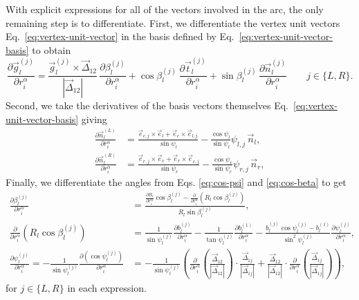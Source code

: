 With explicit expressions for all of the vectors involved in the arc, the only remaining step is to differentiate.
First, we differentiate the vertex unit vectors Eq.\ \eqref{eq:vertex-unit-vector} in the basis defined by Eq.\ \eqref{eq:vertex-unit-vector-basis} to obtain
\begin{equation}
  \frac{\partial \vec{g}_l^{(j)}}{\partial r_i^\alpha} =
  \frac{\vec{g}_l^{(j)} \times \vec{\Delta}_{12}}{|\vec{\Delta}_{12}|} \,
  \frac{\partial \beta_l^{(j)}}{\partial r_i^\alpha} +
  \cos{\beta_l^{(j)}} \,
  \frac{\partial \vec{t}_l^{(j)}}{\partial r_i^\alpha} +
  \sin{\beta_l^{(j)}} \,
  \frac{\partial \vec{n}_l^{(j)}}{\partial r_i^\alpha}
  \qquad j \in \{L,R\}.
\end{equation}
Second, we take the derivatives of the basis vectors themselves Eq.\ \eqref{eq:vertex-unit-vector-basis} giving
\begin{subequations}
\begin{align}
  \frac{\partial \vec{n}_l^{(L)}}{\partial r_i^\alpha} &=
  \frac{\vec{e}_{c,j} \times \vec{e}_l + \vec{e}_c \times \vec{e}_{l,j}}{\sin{\psi_l}}
  - \frac{\cos{\psi_l}}{\sin{\psi_l}} \psi_{l,j} \, \vec{n}_l, \\
  \frac{\partial \vec{n}_l^{(R)}}{\partial r_i^\alpha} &=
  \frac{\vec{e}_{r,j} \times \vec{e}_c + \vec{e}_r \times \vec{e}_{c,j}}{\sin{\psi_r}}
  - \frac{\cos{\psi_r}}{\sin{\psi_r}} \psi_{r,j} \, \vec{n}_r,
\end{align}
\end{subequations}
Finally, we differentiate the angles from Eqs. \eqref{eq:cos-psi} and \eqref{eq:cos-beta} to get
\begin{subequations}
\begin{align}
 \frac{\partial \beta_l^{(j)}}{\partial r_i^\alpha} &=
  \frac{
  \frac{\partial R_l}{\partial r_i^\alpha}
  \cos{\beta_l^{(j)}} -
  \frac{\partial}{\partial r_i^\alpha}
  \left( R_l \cos{\beta_l^{(j)}} \right)}
  {R_l \sin{\beta_l^{(j)}}}, \\
 \frac{\partial}{\partial r_i^\alpha}
  \left( R_l \cos{\beta_l^{(j)}} \right) &=
  \frac{1}{\sin{\psi_l^{(j)}}}
  \frac{\partial b_l^{(j)}}{\partial r_i^\alpha}
  - \frac{1}{\tan{\psi_l^{(j)}}}
  \frac{\partial b_l^{(1)}}{\partial r_i^\alpha}
  - \frac{b_l^{(j)} \cos{\psi_l^{(j)}} - b_l^{(1)}}
  {\sin^2{\psi_l^{(j)}}}
  \frac{\partial \psi_l^{(j)}}{\partial r_i^\alpha}, \\
  \frac{\partial \psi_l^{(j)}}{\partial r_i^\alpha} =
  -\frac{1}{\sin\psi_l^{(j)}} \frac{\partial(\cos{\psi_l^{(j)}})}{\partial r_i^\alpha} &=
  -\frac{1}{\sin\psi_l^{(j)}}
  \left(
  \frac{\partial}{\partial r_i^\alpha}
  \left( \frac{\vec{\Delta}_{12}}{|\vec{\Delta}_{12}|} \right) \cdot
  \frac{\vec{\Delta}_{1j}}{|\vec{\Delta}_{1j}|}
  +
  \frac{\vec{\Delta}_{12}}{|\vec{\Delta}_{12}|} \cdot
  \frac{\partial}{\partial r_i^\alpha}
  \left( \frac{\vec{\Delta}_{1j}}{|\vec{\Delta}_{1j}|} \right)
  \right),
\end{align}
\end{subequations}
for $j \in \{L,R\}$ in each expression.

